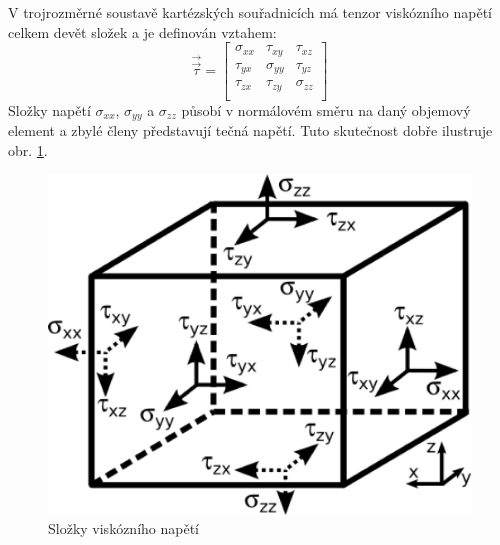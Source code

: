 V trojrozměrné soustavě kartézských souřadnicích má tenzor viskózního napětí celkem devět složek a je definován vztahem:
\begin{equation}
    \vec{\vec{\tau}} = 
    \begin{bmatrix}
      \sigma_{xx} & \tau_{xy} & \tau_{xz}\\ 
      \tau_{yx} & \sigma_{yy} & \tau_{yz}\\ 
      \tau_{zx} & \tau_{zy} & \sigma_{zz}\\ 
    \end{bmatrix}
  	\label{eq:tenstress}
\end{equation} 
Složky napětí $\sigma_{xx}$, $\sigma_{yy}$ a $\sigma_{zz}$ působí v normálovém směru na daný objemový element a zbylé členy představují tečná napětí. Tuto skutečnost dobře ilustruje obr. \ref{fig:stresses}. 

\begin{figure}[h!]
\begin{center}
  \includegraphics[scale=0.13]{images/stresses.eps}
  \caption{Složky viskózního napětí}
  \label{fig:stresses}
\end{center}
\end{figure} 

